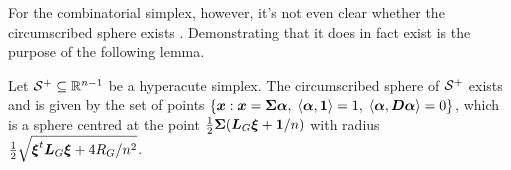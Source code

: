 For the combinatorial simplex, however, it's not even clear whether the circumscribed sphere exists . Demonstrating that it does in fact exist is the purpose of the following lemma. 

\begin{lemma}
	\label{lem:circ_sphere}
	Let $\mathcal{S}^+\subseteq\mathbb{R}^{n-1}$ be a hyperacute simplex. The circumscribed sphere  of $\mathcal{S}^+$ exists and is given by the set of points $\{\vb*{x}:\vb*{x}=\boldsymbol{\Sigma}\vb*{\alpha}, \; \langle \vb*{\alpha},\vb{1} \rangle = 1, \; \langle \vb*{\alpha},\vb*{D}\vb*{\alpha}\rangle =0\}$, which is a sphere centred at the point $\frac{1}{2}\boldsymbol{\Sigma}(\vb*{L}_G\vb*{\xi} + \vb{1}/n)$ with radius $\frac{1}{2}\sqrt{\vb*{\xi}^t\vb*{L}_G\vb*{\xi} + 4R_G/n^2}$. 
\end{lemma}
